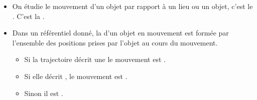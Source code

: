 \begin{mybilan}
	\begin{itemize}
		\item On étudie le mouvement d'un objet par rapport à un lieu ou un objet, c'est le . C'est la .
				
		\item Dans un référentiel donné, la  d'un objet en mouvement est formée par l'ensemble des positions prises par l'objet au cours du mouvement.		
		\begin{itemize}
			\item Si la trajectoire décrit une  le mouvement est .
			\item Si elle décrit , le mouvement est .
			\item Sinon il est .
		\end{itemize}	
		
	\end{itemize}
\end{mybilan}